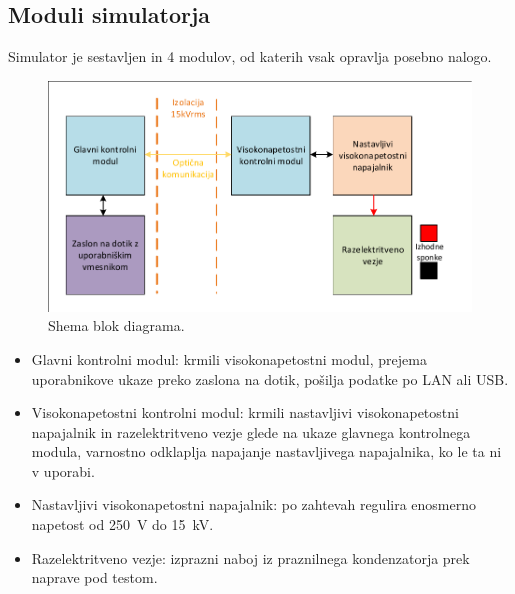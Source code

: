 \documentclass[a4paper,twoside,openright,12pt,Slovene]{book}
\begin{document}
	\subsection{Moduli simulatorja}
	Simulator je sestavljen in 4 modulov, od katerih vsak opravlja posebno nalogo.
	\begin{figure}[h]
    \centering
    \includegraphics[width=1\columnwidth]{Sheme/Osnovna blok shema poenostavljena.pdf}
    \caption{\label{BlokDiagramShema} Shema blok diagrama.}
	\end{figure}
	
	\begin{itemize}
		\item Glavni kontrolni modul: krmili visokonapetostni modul, prejema uporabnikove ukaze preko zaslona na dotik, pošilja podatke po LAN ali USB.
		\item Visokonapetostni kontrolni modul: krmili nastavljivi visokonapetostni napajalnik in razelektritveno vezje glede na ukaze glavnega kontrolnega modula, varnostno odklaplja napajanje nastavljivega napajalnika, ko le ta ni v uporabi.
		\item Nastavljivi visokonapetostni napajalnik: po zahtevah regulira enosmerno napetost od \SI{250}{\volt} do \SI{15}{\kilo\volt}.
		\item Razelektritveno vezje: izprazni naboj iz praznilnega kondenzatorja prek naprave pod testom.
	\end{itemize}
\end{document}
